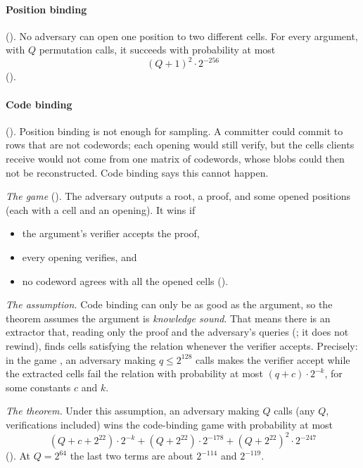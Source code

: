 \documentclass[11pt]{article}
\begin{document}
\paragraph{Position binding} (). No adversary can open one
position to two different cells. For every argument, with $Q$ permutation calls, it succeeds with
probability at most
\[
\boxed{\ (Q+1)^2\cdot 2^{-256}\ }
\]
().

\paragraph{Code binding} (). Position binding is not enough for
sampling. A committer could commit to rows that are not codewords; each opening would still
verify, but the cells clients receive would not come from one matrix of codewords, whose blobs could then not
be reconstructed. Code binding says this cannot happen.

\emph{The game} (). The adversary outputs a root, a proof, and some opened
positions (each with a cell and an opening). It wins if
\begin{itemize}
\item the argument's verifier accepts the proof,
\item every opening verifies, and
\item no codeword agrees with all the opened cells ().
\end{itemize}

\emph{The assumption.} Code binding can only be as good as the argument, so the theorem assumes the
argument is \emph{knowledge sound}. That means there is an extractor that, reading only the proof
and the adversary's queries (; it does not rewind), finds cells satisfying the
relation whenever the verifier accepts. Precisely: in the game , an adversary making
$q \le 2^{128}$ calls makes the verifier accept while the extracted cells fail the relation with
probability at most $(q + c)\cdot 2^{-k}$, for some constants $c$ and $k$.

\emph{The theorem.} Under this assumption, an adversary making $Q$ calls (any $Q$, verifications
included) wins the code-binding game with probability at most
\[
\boxed{\ (Q + c + 2^{22})\cdot 2^{-k} + (Q + 2^{22})\cdot 2^{-178} + (Q + 2^{22})^2\cdot 2^{-247}\ }
\]
(). At $Q = 2^{64}$ the last two terms are about
$2^{-114}$ and $2^{-119}$.
\end{document}
